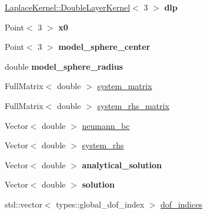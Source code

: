 \begin{DoxyCompactItemize}
\hyperlink{classLaplaceBEM_1_1LaplaceKernel_1_1DoubleLayerKernel}{Laplace\+Kernel\+::\+Double\+Layer\+Kernel}$<$ 3 $>$ {\bfseries dlp}
\item 
\mbox{\label{classLaplaceBEM_1_1Erichsen1996Efficient_1_1Example2_a32fdd8e2e8a8f815bb304a73da1b9713}} 
Point$<$ 3 $>$ {\bfseries x0}
\item 
\mbox{\label{classLaplaceBEM_1_1Erichsen1996Efficient_1_1Example2_a72d0905d33d5f7bc1299809a21fe5a51}} 
Point$<$ 3 $>$ {\bfseries model\+\_\+sphere\+\_\+center}
\item 
\mbox{\label{classLaplaceBEM_1_1Erichsen1996Efficient_1_1Example2_a3ff5091415373a71bb59fcc6df159c81}} 
double {\bfseries model\+\_\+sphere\+\_\+radius}
\item 
Full\+Matrix$<$ double $>$ \hyperlink{classLaplaceBEM_1_1Erichsen1996Efficient_1_1Example2_a9c76773c78cc3a09eb1f7e4f9d44d0c8}{system\+\_\+matrix}
\item 
Full\+Matrix$<$ double $>$ \hyperlink{classLaplaceBEM_1_1Erichsen1996Efficient_1_1Example2_a13e4add9320ecede8e53b7a633805740}{system\+\_\+rhs\+\_\+matrix}
\item 
Vector$<$ double $>$ \hyperlink{classLaplaceBEM_1_1Erichsen1996Efficient_1_1Example2_a52203aaab49947b16cf4f1a46f245375}{neumann\+\_\+bc}
\item 
Vector$<$ double $>$ \hyperlink{classLaplaceBEM_1_1Erichsen1996Efficient_1_1Example2_a7de5f9e1f110ec7f842577a54dddd267}{system\+\_\+rhs}
\item 
\mbox{\label{classLaplaceBEM_1_1Erichsen1996Efficient_1_1Example2_a04c3a97e7c2a19636bcc3dcfe21f49b5}} 
Vector$<$ double $>$ {\bfseries analytical\+\_\+solution}
\item 
\mbox{\label{classLaplaceBEM_1_1Erichsen1996Efficient_1_1Example2_a2cbc38adde4b9fdf2cd1bf322b046b6c}} 
Vector$<$ double $>$ {\bfseries solution}
\item 
std\+::vector$<$ types\+::global\+\_\+dof\+\_\+index $>$ \hyperlink{classLaplaceBEM_1_1Erichsen1996Efficient_1_1Example2_aeab9b4719f0dfe0086b51ce909f056fb}{dof\+\_\+indices}

\end{DoxyCompactItemize}
